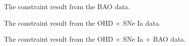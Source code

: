 \documentclass[twocolumn]{aastex631}
\begin{document}
   \begin{figure}[htbp]
      \centering
      \caption{The constraint result from the BAO data.}
   \end{figure}

   \begin{figure}[htbp]
      \centering
      \caption{The constraint result from the OHD + SNe Ia data.}
   \end{figure}

   \begin{figure}[htbp]
      \centering
      \caption{The constraint result from the OHD + SNe Ia + BAO data.}
   \end{figure}
\end{document}
